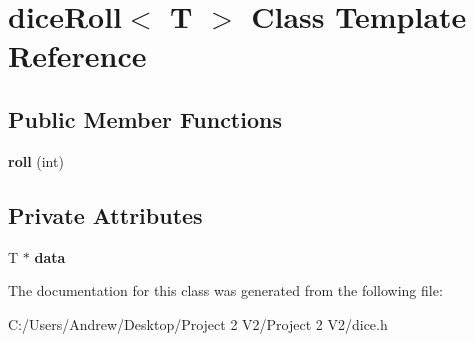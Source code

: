 \hypertarget{classdice_roll}{}\section{dice\+Roll$<$ T $>$ Class Template Reference}
\label{classdice_roll}
\subsection*{Public Member Functions}
\begin{DoxyCompactItemize}
\item 
\mbox{\label{classdice_roll_acabe620a4ddacc7c95c3ec3cdaf87e92}} 
{\bfseries roll} (int)
\end{DoxyCompactItemize}
\subsection*{Private Attributes}
\begin{DoxyCompactItemize}
\item 
\mbox{\label{classdice_roll_a02f17349ce7d83129bf01297ce86148e}} 
T $\ast$ {\bfseries data}
\end{DoxyCompactItemize}


The documentation for this class was generated from the following file\+:\begin{DoxyCompactItemize}
\item 
C\+:/\+Users/\+Andrew/\+Desktop/\+Project 2 V2/\+Project 2 V2/dice.\+h\end{DoxyCompactItemize}
